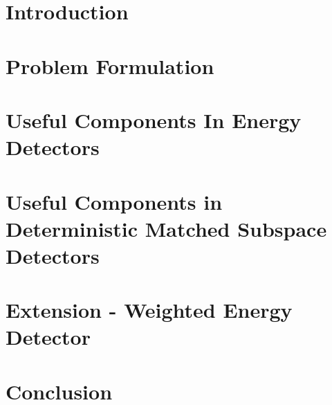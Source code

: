 \section{Introduction}\label{sec:intro}


\section{Problem Formulation}\label{sec:energy_detector}


\section{Useful Components In Energy Detectors}\label{sec:useful}


\section{Useful Components in Deterministic Matched Subspace Detectors}\label{sec:msd}


\section{Extension - Weighted Energy Detector}\label{sec:ext}




\section{Conclusion}\label{sec:conclusion}


%
%
